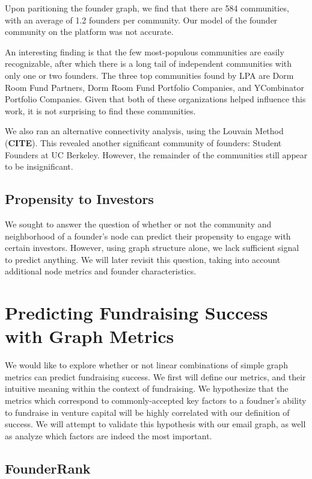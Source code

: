 Upon paritioning the founder graph, we find that there are 584 communities, with an average of 1.2 founders per community. Our model of the founder community on the platform was not accurate.

An interesting finding is that the few most-populous communities are easily recognizable, after which there is a long tail of independent communities with only one or two founders. The three top communities found by LPA are Dorm Room Fund Partners, Dorm Room Fund Portfolio Companies, and YCombinator Portfolio Companies. Given that both of these organizations helped influence this work, it is not surprising to find these communities.

We also ran an alternative connectivity analysis, using the Louvain Method (\textbf{CITE}). This revealed another significant community of founders: Student Founders at UC Berkeley. However, the remainder of the communities still appear to be insignificant.

\subsection{Propensity to Investors}

We sought to answer the question of whether or not the community and neighborhood of a founder's node can predict their propensity to engage with certain investors. However, using graph structure alone, we lack sufficient signal to predict anything. We will later revisit this question, taking into account additional node metrics and founder characteristics.

\section{Predicting Fundraising Success with Graph Metrics}

We would like to explore whether or not linear combinations of simple graph metrics can predict fundraising success. We first will define our metrics, and their intuitive meaning within the context of fundraising.  We hypothesize that the metrics which correspond to commonly-accepted key factors to a foudner's ability to fundraise in venture capital will be highly correlated with our definition of success. We will attempt to validate this hypothesis with our email graph, as well as analyze which factors are indeed the most important.

\subsection{FounderRank}

